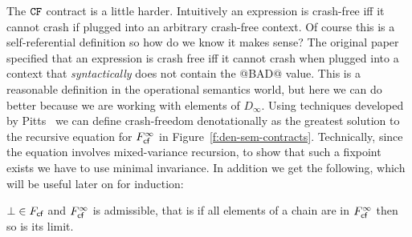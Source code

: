 The ${\tt CF}$ contract is a little harder. Intuitively an expression is crash-free iff it cannot
crash if plugged into an arbitrary crash-free context. Of course this is a
self-referential definition so how do we know it makes sense? The original paper
\cite{xu+:contracts} specified that an expression is crash free iff it
cannot crash when plugged into a context that {\em syntactically} does not contain the
@BAD@ value. This is a reasonable definition in the operational semantics world, but
here we can do better because we are working with elements of $D_\infty$. Using
techniques developed by Pitts~\cite{pitts-rel-domains} we can define crash-freedom denotationally as the greatest solution
to the recursive equation for $F_{\textsf{cf}}^{\infty}$ in Figure~\ref{f:den-sem-contracts}. Technically,
since the equation involves mixed-variance recursion, to show that such a fixpoint exists we have
to use minimal invariance.
In addition we get the following, which will be useful later on for induction:
\begin{lemma}\label{lem:cf-admissible}
$\bot \in F_{\textsf{cf}}$ and $F_{\textsf{cf}}^{\infty}$ is admissible, that is if all elements of a chain are in
$F_{\textsf{cf}}^{\infty}$ then so is its limit.
\end{lemma}

